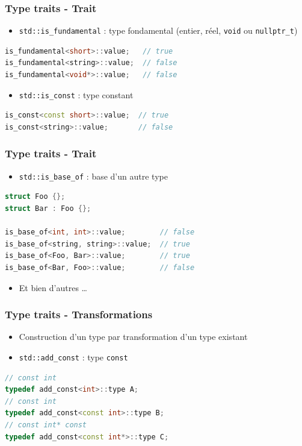 \documentclass[C++.tex]{subfiles}
\begin{document}
\begin{frame}[fragile]
	\frametitle{Type traits - Trait}
	\begin{itemize}
		\item \lstinline|std::is_fundamental| : type fondamental (entier, réel, \lstinline|void| ou \lstinline|nullptr_t|)
	\end{itemize}

	\begin{lstlisting}[language=C++]
is_fundamental<short>::value;   // true
is_fundamental<string>::value;  // false
is_fundamental<void*>::value;   // false\end{lstlisting}

	\begin{itemize}
		\item \lstinline|std::is_const| : type constant
	\end{itemize}

	\begin{lstlisting}[language=C++]
is_const<const short>::value;  // true
is_const<string>::value;       // false\end{lstlisting}
\end{frame}

\begin{frame}[fragile]
	\frametitle{Type traits - Trait}
	\begin{itemize}
		\item \lstinline|std::is_base_of| : base d'un autre type
	\end{itemize}

	\begin{lstlisting}[language=C++]
struct Foo {};
struct Bar : Foo {};

is_base_of<int, int>::value;        // false
is_base_of<string, string>::value;  // true
is_base_of<Foo, Bar>::value;        // true
is_base_of<Bar, Foo>::value;        // false\end{lstlisting}

	\begin{itemize}
		\item Et bien d'autres \ldots
	\end{itemize}
\end{frame}

\begin{frame}[fragile]
	\frametitle{Type traits - Transformations}
	\begin{itemize}
		\item Construction d'un type par transformation d'un type existant
		\item \lstinline|std::add_const| : type \lstinline|const|
	\end{itemize}

	\begin{lstlisting}[language=C++]
// const int
typedef add_const<int>::type A;
// const int
typedef add_const<const int>::type B;
// const int* const
typedef add_const<const int*>::type C;\end{lstlisting}
\end{frame}
\end{document}
